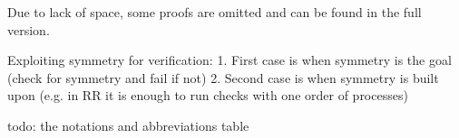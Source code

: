 Due to lack of space, some proofs are omitted and can be found in the full version.

Exploiting symmetry for verification:
1.	First case is when symmetry is the goal (check for symmetry and fail if not)
2.	Second case is when symmetry is built upon (e.g. in RR it is enough to run checks with one order of processes)

\gls{todo}: the notations and abbreviations table
